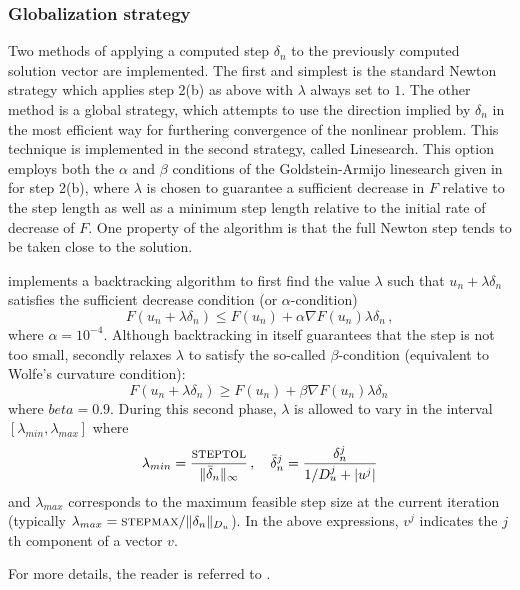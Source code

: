 
\subsubsection*{Globalization strategy}
Two methods of applying a computed step $\delta_n$ to the
previously computed solution vector are implemented. The first and
simplest is the standard Newton strategy which applies step 2(b) as
above with $\lambda$ always set to $1$. The other method is a
global strategy, which attempts to use the direction implied by
$\delta_n$ in the most efficient way for furthering convergence of
the nonlinear problem. This technique is implemented in the second
strategy, called Linesearch.  This option employs both the
$\alpha$ and $\beta$ conditions of the Goldstein-Armijo linesearch
given in \cite{DeSc:96} for step 2(b), where $\lambda$ is chosen
to guarantee a sufficient decrease in $F$ relative to the step
length as well as a minimum step length relative to the initial
rate of decrease of $F$.  One property of the algorithm is that
the full Newton step tends to be taken close to the solution.  

{\kinsol} implements a backtracking algorithm to first find
the value $\lambda$ such that $u_n + \lambda \delta_n$
satisfies the sufficient decrease condition (or $\alpha$-condition)
\[
F(u_n + \lambda\delta_n) \le F(u_n) + \alpha \nabla F(u_n) \lambda\delta_n \, ,
\]
where $\alpha = 10^{-4}$.
Although backtracking in itself guarantees that the step is not too small,
{\kinsol} secondly relaxes $\lambda$ to satisfy the so-called $\beta$-condition
(equivalent to Wolfe's curvature condition):
\[
F(u_n + \lambda\delta_n) \ge F(u_n) + \beta \nabla F(u_n) \lambda\delta_n \,
\]
where $beta = 0.9$. During this second phase, $\lambda$ is allowed to
vary in the interval $[\lambda_{min} , \lambda_{max}]$ where
\[
\lambda_{min} =  \frac{\mbox{\sc steptol}}{\| \bar\delta_n\|_{\infty}} \, , \quad
\bar\delta_n^j = \frac{\delta_n^j}{1/D_u^j + |u^j|}
\]
and $\lambda_{max}$ corresponds to the maximum feasible step size at the
current iteration (typically $\lambda_{max} = \mbox{\sc stepmax} / \|\delta_n\|_{D_u}$).
In the above expressions, $v^j$ indicates the $j$th component of a vector $v$.

For more details, the reader is referred to \cite{DeSc:96}.


